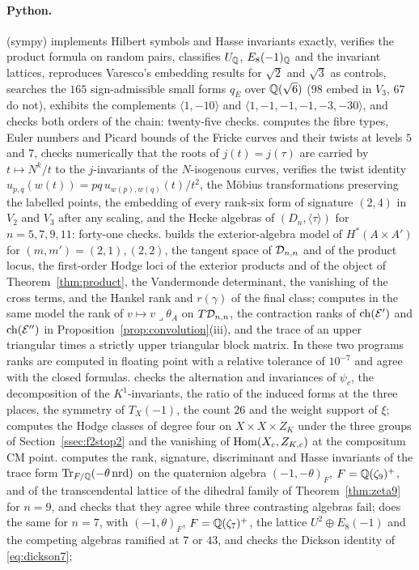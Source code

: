 \paragraph{Python.}  (sympy) implements Hilbert symbols and Hasse invariants exactly, verifies the product formula on random pairs, classifies $U_{\mathbb{Q}}$, $E_{8}(-1)_{\mathbb{Q}}$ and the invariant lattices, reproduces Varesco's embedding results for $\sqrt2$ and $\sqrt3$ as controls, searches the $165$ sign-admissible small forms $q_{E}$ over $\mathbb{Q}(\sqrt6)$ ($98$ embed in $V_{3}$, $67$ do not), exhibits the complements $\langle1,-10\rangle$ and $\langle1,-1,-1,-1,-3,-30\rangle$, and checks both orders of the chain: twenty-five checks.  computes the fibre types, Euler numbers and Picard bounds of the Fricke curves and their twists at levels $5$ and $7$, checks numerically that the roots of $j(t)=j(\tau)$ are carried by $t\mapsto N^{k}/t$ to the $j$-invariants of the $N$-isogenous curves, verifies the twist identity $u_{p,q}(w(t))=pq\,u_{w(p),w(q)}(t)/t^{2}$, the M\"obius transformations preserving the labelled points, the embedding of every rank-six form of signature $(2,4)$ in $V_{2}$ and $V_{3}$ after any scaling, and the Hecke algebras of $(D_{n},\langle\tau\rangle)$ for $n=5,7,9,11$: forty-one checks.  builds the exterior-algebra model of $H^{*}(A\times A')$ for $(m,m')=(2,1),(2,2)$, the tangent space of $\mathcal{D}_{n,n}$ and of the product locus, the first-order Hodge loci of the exterior products and of the object of Theorem~\ref{thm:product}, the Vandermonde determinant, the vanishing of the cross terms, and the Hankel rank and $r(\gamma)$ of the final class;  computes in the same model the rank of $v\mapsto v\lrcorner\theta_{A}$ on $T\mathcal{D}_{n,n}$, the contraction ranks of $\mathrm{ch}(\mathcal{E}')$ and $\mathrm{ch}(\mathcal{E}'')$ in Proposition~\ref{prop:convolution}(iii), and the trace of an upper triangular times a strictly upper triangular block matrix. In these two programs ranks are computed in floating point with a relative tolerance of $10^{-7}$ and agree with the closed formulas.  checks the alternation and invariances of $\psi_{c}$, the decomposition of the $K^{1}$-invariants, the ratio of the induced forms at the three places, the symmetry of $T_{X}(-1)$, the count $26$ and the weight support of $\xi$;  computes the Hodge classes of degree four on $X\times X\times Z_{K}$ under the three groups of Section~\ref{ssec:f2stop2} and the vanishing of $\mathrm{Hom}(X_{c},Z_{K,c})$ at the compositum CM point.  computes the rank, signature, discriminant and Hasse invariants of the trace form $\mathrm{Tr}_{F/\mathbb{Q}}(-\theta\,\mathrm{nrd})$ on the quaternion algebra $(-1,-\theta)_{F}$, $F=\mathbb{Q}(\zeta_{9})^{+}$, and of the transcendental lattice of the dihedral family of Theorem~\ref{thm:zeta9} for $n=9$, and checks that they agree while three contrasting algebras fail;  does the same for $n=7$, with $(-1,\theta)_{F}$, $F=\mathbb{Q}(\zeta_{7})^{+}$, the lattice $U^{2}\oplus E_{8}(-1)$ and the competing algebras ramified at $7$ or $43$, and checks the Dickson identity of \eqref{eq:dickson7}; 